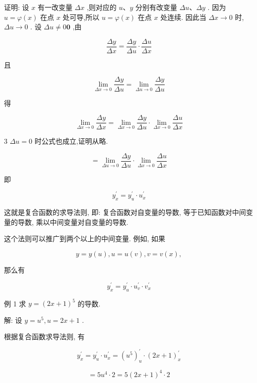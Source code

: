 \documentclass[lang=cn,newtx,10pt,scheme=chinese]{elegantbook}
\begin{document}
证明: 设 \(x\) 有一改变量 \({\Delta x}\) ,则对应的 \(u\text{、}y\) 分别有改变量 \({\Delta u}\text{、}{\Delta y}\) . 因为 \(u = \varphi \left( x\right)\) 在点 \(x\) 处可导,所以 \(u = \varphi \left( x\right)\) 在点 \(x\) 处连续. 因此当 \({\Delta x} \rightarrow 0\) 时, \({\Delta u} \rightarrow 0\) . 设 \({\Delta u} \neq 0\mathbf{0}\) ,由

\[
\frac{\Delta y}{\Delta x} = \frac{\Delta y}{\Delta u} \cdot \frac{\Delta u}{\Delta x}
\]

且

\[
\mathop{\lim }\limits_{{{\Delta x} \rightarrow 0}}\frac{\Delta y}{\Delta u} = \mathop{\lim }\limits_{{{\Delta u} \rightarrow 0}}\frac{\Delta y}{\Delta u}
\]

得

\[
\mathop{\lim }\limits_{{{\Delta x} \rightarrow 0}}\frac{\Delta y}{\Delta x} = \mathop{\lim }\limits_{{{\Delta x} \rightarrow 0}}\frac{\Delta y}{\Delta u} \cdot \mathop{\lim }\limits_{{{\Delta x} \rightarrow 0}}\frac{\Delta u}{\Delta x}
\]

3 \({\Delta u} = 0\) 时公式也成立,证明从略.

\[
= \mathop{\lim }\limits_{{{\Delta u} \rightarrow 0}}\frac{\Delta y}{\Delta u} \cdot \mathop{\lim }\limits_{{{\Delta x} \rightarrow 0}}\frac{\Delta u}{\Delta x}
\]

即

\[
{y}_{x}^{\prime } = {y}_{u}^{\prime } \cdot {u}_{x}^{\prime }
\]

这就是复合函数的求导法则, 即: 复合函数对自变量的导数, 等于已知函数对中间变量的导数, 乘以中间变量对自变量的导数.

这个法则可以推广到两个以上的中间变量. 例如, 如果

\[
y = y\left( u\right) ,u = u\left( v\right) ,v = v\left( x\right) ,
\]

那么有

\[
{y}_{x}^{\prime } = {y}_{u}^{\prime } \cdot {u}_{v}^{\prime } \cdot {v}_{x}^{\prime }
\]

例 1 求 \(y = {\left( 2x + 1\right) }^{5}\) 的导数.

解: 设 \(y = {u}^{5},u = {2x} + 1\) .

根据复合函数求导法则, 有

\[
{y}_{x}^{\prime } = {y}_{u}^{\prime } \cdot {u}_{x}^{\prime } = {\left( {u}^{5}\right) }_{u}^{\prime } \cdot {\left( 2x + 1\right) }_{x}^{\prime }
\]

\[
= 5{u}^{4} \cdot 2 = 5{\left( 2x + 1\right) }^{4} \cdot 2
\]
\end{document}
